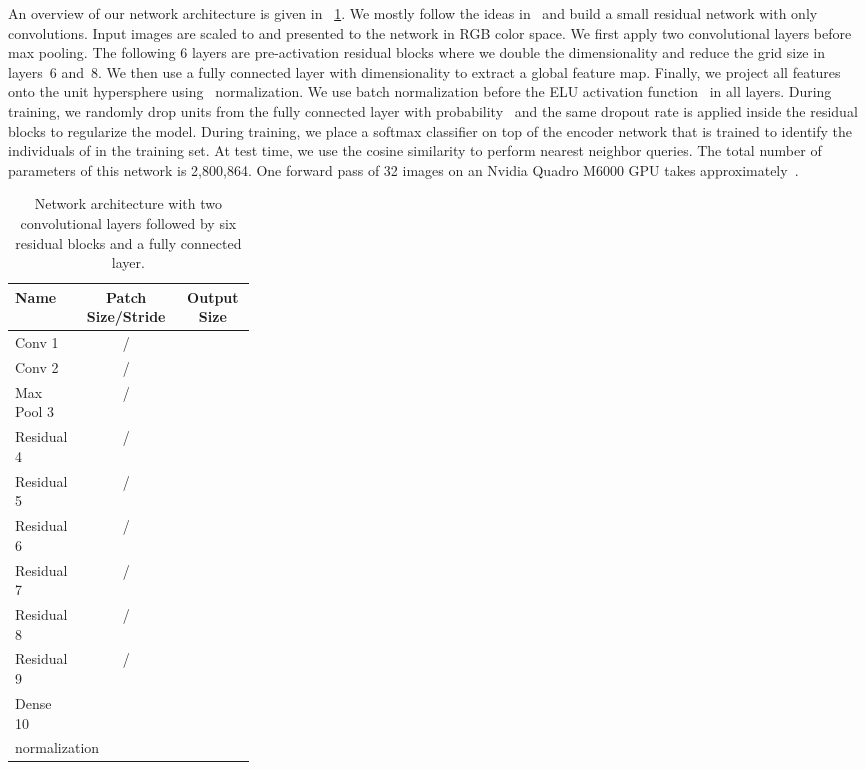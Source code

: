 \documentclass{article}
\begin{document}
An overview of our network architecture is given in
\tablename~\ref{tab:network-architecture}.
We mostly follow the ideas in~\cite{Zagoruyko2016} and build a small
residual network with only  convolutions.
Input images are scaled to  and presented to the network in
RGB color space.
We first apply two convolutional layers before max pooling.
The following 6 layers are pre-activation residual
blocks where we double the dimensionality and reduce the grid size in
layers~6 and~8.
We then use a fully connected layer with dimensionality  to extract
a global feature map.
Finally, we project all features onto the unit hypersphere using~
normalization.
We use batch normalization before the ELU activation function~\cite{Clevert2015}
in all layers.
During training, we randomly drop units from the fully connected layer with
probability~ and the same dropout rate is applied inside the residual
blocks to regularize the model.
During training, we place a softmax classifier on top of the encoder network
that is trained to identify the individuals of in the training set.
At test time, we use the cosine similarity to perform nearest neighbor queries.
The total number of parameters of this network is 2,800,864. One forward pass
of 32 images on an Nvidia Quadro M6000 GPU takes
approximately~.


\begin{table}[t!]
    \begin{tabular}{p{0.28\linewidth}cc}
        \toprule
        \textbf{Name} & \textbf{Patch Size/Stride} & \textbf{Output Size} \\
        \midrule
        Conv 1 & / &  \\
        Conv 2 & / &  \\
        Max Pool 3 & / &  \\
        Residual 4 & / &  \\
        Residual 5 & / &  \\
        Residual 6 & / &  \\
        Residual 7 & / &  \\
        Residual 8 & / &  \\
        Residual 9 & / &  \\
        Dense 10 & &  \\
        \multicolumn{2}{l}{ normalization} &  \\
        \bottomrule
    \end{tabular}
\caption{Network architecture with two convolutional layers followed by
    six residual blocks and a fully connected layer.}
\label{tab:network-architecture}
\end{table}
\end{document}

